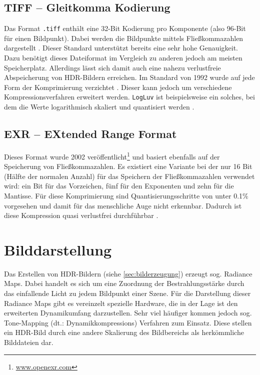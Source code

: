 \subsection{TIFF -- Gleitkomma Kodierung}
\label{sub:tiff}
Das Format \texttt{.tiff} enthält eine 32-Bit Kodierung pro Komponente (also 96-Bit für einen Bildpunkt). Dabei werden die Bildpunkte mittels Fließkommazahlen dargestellt \cite{adobe:tiff}. Dieser Standard unterstützt bereits eine sehr hohe Genauigkeit. Dazu benötigt dieses Dateiformat im Vergleich zu anderen jedoch am meisten Speicherplatz. Allerdings lässt sich damit auch eine nahezu verlustfreie Abspeicherung von \gls{HDR}-Bildern erreichen. Im Standard von 1992 wurde auf jede Form der Komprimierung verzichtet \cite[S. 93]{Reinhard}. Dieser kann jedoch um verschiedene Kompressionsverfahren erweitert werden. \texttt{LogLuv} ist beispielsweise ein solches, bei dem die Werte logarithmisch skaliert und quantisiert werden \cite{logluv}. 


\subsection{EXR -- EXtended Range Format}

Dieses Format wurde 2002 veröffentlicht\footnote{\url{www.openexr.com}} und basiert ebenfalls auf der Speicherung von Fließkommazahlen. Es existiert eine Variante bei der nur 16 Bit (Hälfte der normalen Anzahl) für das Speichern der Fließkommazahlen verwendet wird: ein Bit für das Vorzeichen, fünf für den Exponenten und zehn für die Mantisse. Für diese Komprimierung sind Quantisierungsschritte von unter 0.1\% vorgesehen und damit für das menschliche Auge nicht erkennbar. Dadurch ist diese Kompression quasi verlustfrei durchführbar \cite[S. 97f]{Reinhard}.



\section{Bilddarstellung}
\label{subsec:ToneMapping}
Das Erstellen von \gls{HDR}-Bildern (siehe \autoref{sec:bilderzeugung}) erzeugt sog. \glspl{Radiance Map}. Dabei handelt es sich um eine Zuordnung der Bestrahlungsstärke durch das einfallende Licht zu jedem Bildpunkt einer Szene. 
Für die Darstellung dieser \glspl{Radiance Map} gibt es vereinzelt spezielle Hardware, die in der Lage ist den erweiterten Dynamikumfang darzustellen. Sehr viel häufiger kommen jedoch sog. \gls{Tone-Mapping} (dt.: Dynamikkompressions) Verfahren zum Einsatz. Diese stellen ein HDR-Bild durch eine andere Skalierung des Bildbereichs als herkömmliche Bilddateien dar. 
 
